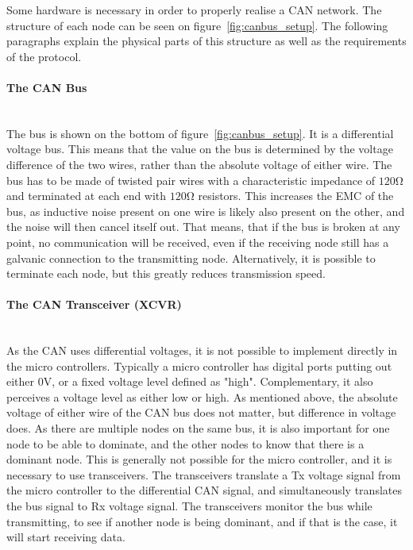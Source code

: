 Some hardware is necessary in order to properly realise a CAN network.
The structure of each node can be seen on figure~\ref{fig:canbus_setup}.
The following paragraphs explain the physical parts of this structure as well as the requirements of the protocol.


\paragraph*{The CAN Bus}~\\
The bus is shown on the bottom of figure~\ref{fig:canbus_setup}.
It is a differential voltage bus.
This means that the value on the bus is determined by the voltage difference of the two wires, rather than the absolute voltage of either wire.
The bus has to be made of twisted pair wires with a characteristic impedance of $\si{120 \ohm}$ and terminated at each end with $\si{120 \ohm}$ resistors.
This increases the EMC of the bus, as inductive noise present on one wire is likely also present on the other, and the noise will then cancel itself out.
That means, that if the bus is broken at any point, no communication will be received, even if the receiving node still has a galvanic connection to the transmitting node.
Alternatively, it is possible to terminate each node, but this greatly reduces transmission speed.\\
\paragraph*{The CAN Transceiver (XCVR)}~\\
As the CAN uses differential voltages, it is not possible to implement directly in the micro controllers.
Typically a micro controller has digital ports putting out either $ 0 \si{\volt}$, or a fixed voltage level defined as "high".
Complementary, it also perceives a voltage level as either low or high. 
As mentioned above, the absolute voltage of either wire of the CAN bus does not matter, but difference in voltage does. 
As there are multiple nodes on the same bus, it is also important for one node to be able to dominate, and the other nodes to know that there is a dominant node. 
This is generally not possible for the micro controller, and it is necessary to use transceivers.
The transceivers translate a Tx voltage signal from the micro controller to the differential CAN signal, and simultaneously translates the bus signal to Rx voltage signal.
The transceivers monitor the bus while transmitting, to see if another node is being dominant, and if that is the case, it will start receiving data.

